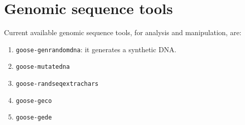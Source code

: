 \chapter{Genomic sequence tools}
\label{gst}

Current available genomic sequence tools, for analysis and manipulation, are:
\begin{enumerate}
\item \texttt{goose-genrandomdna}: it generates a synthetic DNA.
\item \texttt{goose-mutatedna}
\item \texttt{goose-randseqextrachars}
\item \texttt{goose-geco}
\item \texttt{goose-gede}
\end{enumerate}



%
%
%
%